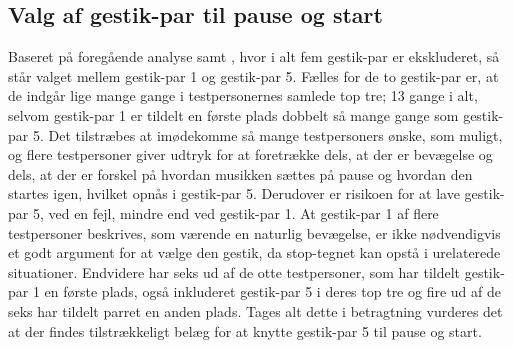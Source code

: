 \subsection{Valg af gestik-par til pause og start}
\label{TestresultaterValgAfGestikkerValgPauseStart}
%
Baseret på foregående analyse samt , hvor i alt fem gestik-par er ekskluderet, så står valget mellem gestik-par 1 og gestik-par 5. Fælles for de to gestik-par er, at de indgår lige mange gange i testpersonernes samlede top tre; 13 gange i alt, selvom gestik-par 1 er tildelt en første plads dobbelt så mange gange som gestik-par 5. Det tilstræbes at imødekomme så mange testpersoners ønske, som muligt, og flere testpersoner giver udtryk for at foretrække dels, at der er bevægelse og dels, at der er forskel på hvordan musikken sættes på pause og hvordan den startes igen, hvilket opnås i gestik-par 5. Derudover er risikoen for at lave gestik-par 5, ved en fejl, mindre end ved gestik-par 1. At gestik-par 1 af flere testpersoner beskrives, som værende en naturlig bevægelse, er ikke nødvendigvis et godt argument for at vælge den gestik, da stop-tegnet kan opstå i urelaterede situationer. Endvidere har seks ud af de otte testpersoner, som har tildelt gestik-par 1 en første plads, også inkluderet gestik-par 5 i deres top tre og fire ud af de seks har tildelt parret en anden plads. Tages alt dette i betragtning vurderes det at der findes tilstrækkeligt belæg for at knytte gestik-par 5 til pause og start.            





